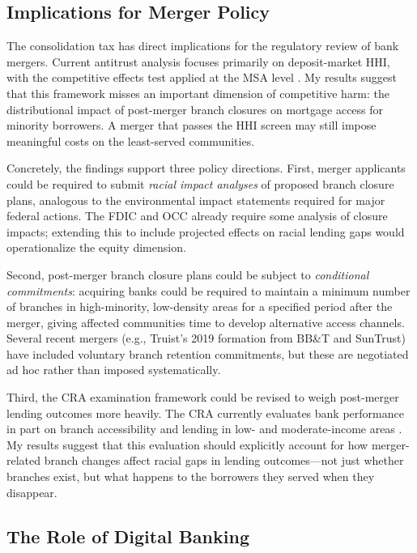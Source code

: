 \documentclass[12pt]{article}
\begin{document}
\subsection{Implications for Merger Policy}

The consolidation tax has direct implications for the regulatory review of bank mergers. Current antitrust analysis focuses primarily on deposit-market HHI, with the competitive effects test applied at the MSA level \citep{focarelli2003}. My results suggest that this framework misses an important dimension of competitive harm: the distributional impact of post-merger branch closures on mortgage access for minority borrowers. A merger that passes the HHI screen may still impose meaningful costs on the least-served communities.

Concretely, the findings support three policy directions. First, merger applicants could be required to submit \emph{racial impact analyses} of proposed branch closure plans, analogous to the environmental impact statements required for major federal actions. The FDIC and OCC already require some analysis of closure impacts; extending this to include projected effects on racial lending gaps would operationalize the equity dimension.

Second, post-merger branch closure plans could be subject to \emph{conditional commitments}: acquiring banks could be required to maintain a minimum number of branches in high-minority, low-density areas for a specified period after the merger, giving affected communities time to develop alternative access channels. Several recent mergers (e.g., Truist's 2019 formation from BB\&T and SunTrust) have included voluntary branch retention commitments, but these are negotiated ad hoc rather than imposed systematically.

Third, the CRA examination framework could be revised to weigh post-merger lending outcomes more heavily. The CRA currently evaluates bank performance in part on branch accessibility and lending in low- and moderate-income areas \citep{ringo2023}. My results suggest that this evaluation should explicitly account for how merger-related branch changes affect racial gaps in lending outcomes---not just whether branches exist, but what happens to the borrowers they served when they disappear.

\subsection{The Role of Digital Banking}
\end{document}

